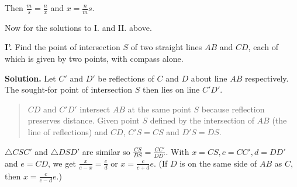 \documentclass[11pt,a4paper]{article}
\newcommand*{\qed}{%
$\quad\quad$\raisebox{2pt}{\framebox[10pt]{\rule{0pt}{4pt}}}%
}
\begin{document}
Then $\frac{m}{s} = \frac{n}{x}$ and $x=\frac{n}{m}s$. \qed


Now for the solutions to I. and II. above.

\textbf{I’.} Find the point of intersection $S$ of two straight lines $AB$ and $CD$, each of which is given by two points, with compass alone.

\textbf{Solution.} Let $C'$ and $D'$ be reflections of $C$ and $D$ about line $AB$ respectively. The sought-for point of intersection $S$ then lies on line $C'D'$.

\begin{quote}
$CD$ and $C'D'$ intersect $AB$ at the same point $S$ because reflection preserves distance. Given point $S$ defined by the intersection of $AB$ (the line of reflections) and $CD$, $C'S=CS$ and $D'S=DS$.
\end{quote}

\begin{center}
\end{center}

$\triangle CSC'$ and $\triangle DSD'$ are similar so $\frac{CS}{DS} = \frac{CC'}{DD'}$. With $x = CS, c = CC', d = DD'$ and $e = CD$, we get $\frac{x}{e-x} = \frac{c}{d}$ or $x=\frac{c}{c+d}e$. (If $D$ is on the same side of $AB$ as $C$, then $x = \frac{c}{c-d}e$.)
\end{document}
